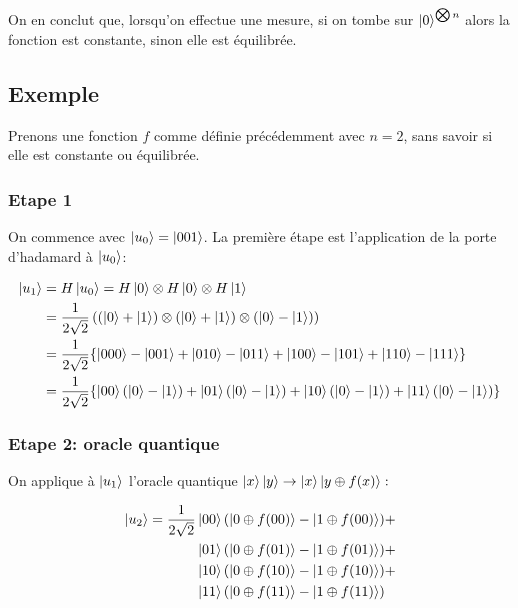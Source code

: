 On en conclut que, lorsqu'on effectue une mesure, si on tombe sur $\ket{0}^{\bigotimes n}$ alors la fonction est constante, sinon elle est équilibrée.


\subsection{Exemple}

Prenons une fonction $f$ comme définie précédemment avec $n=2$, sans
savoir si elle est constante ou équilibrée.

\subsubsection{Etape 1}


On commence avec $\ket{u_0} = \ket{001}$. La première étape est
l'application de la porte d'hadamard à $\ket{u_0}$:

\begin{align}
\ket{u_1} &= H\ket{u_0} = H\ket{0} \otimes H\ket{0} \otimes H\ket{1} \nonumber \\
& = \frac{1}{2\sqrt{2}} \left( (\ket{0} + \ket{1})\otimes(\ket{0} + \ket{1})\otimes(\ket{0} - \ket{1}) \right) \nonumber \\
 & = \frac{1}{2\sqrt{2}}\{\ket{000} - \ket{001} + \ket{010} - \ket{011} + \ket{100} - \ket{101} + \ket{110} - \ket{111}\} \nonumber \\
& = \frac{1}{2\sqrt{2}}\{\ket{00}(\ket{0} - \ket{1}) + \ket{01}(\ket{0} - \ket{1}) + \ket{10}(\ket{0} - \ket{1}) + \ket{11}(\ket{0} - \ket{1})\}
\end{align}


\subsubsection{Etape 2: oracle quantique}

On applique à $\ket{u_1}$ l'oracle quantique $\ket{x}\ket{y}\rightarrow\ket{x}\ket{y\oplus f(x)}:$

\begin{align*}
\ket{u_2}  =  \frac{1}{2\sqrt{2}}  & \ket{00}(\ket{0 \oplus f(00)} - \ket{1 \oplus f(00)}) + \\
& \ket{01}(\ket{0 \oplus f(01)} - \ket{1 \oplus f(01)}) + \\
& \ket{10}(\ket{0 \oplus f(10)} - \ket{1 \oplus f(10)}) + \\
& \ket{11}(\ket{0 \oplus f(11)} - \ket{1 \oplus f(11)})  \\
\end{align*}


